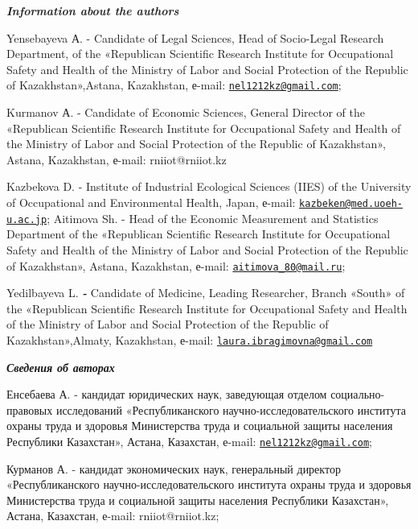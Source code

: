 \begin{authorinfo}
\emph{{\bfseries Information about the authors}}

Yensebayeva А. - Candidate of Legal Sciences, Head of Socio-Legal
Research Department, of the «Republican Scientific Research Institute
for Occupational Safety and Health of the Ministry of Labor and Social
Protection of the Republic of Kazakhstan»,Astana, Kazakhstan, е-mail:
\href{mailto:nel1212kz@gmail.com}{\nolinkurl{nel1212kz@gmail.com}};

Kurmanov А. - Candidate of Economic Sciences, General Director of the
«Republican Scientific Research Institute for Occupational Safety and
Health of the Ministry of Labor and Social Protection of the Republic of
Kazakhstan», Astana, Kazakhstan, е-mail: rniiot@rniiot.kz

Kazbekova D. - Institute of Industrial Ecological Sciences (IIES) of the
University of Occupational and Environmental Health, Japan, е-mail:
\href{mailto:kazbeken@med.uoeh-u.ac.jp}{\nolinkurl{kazbeken@med.uoeh-u.ac.jp}};
Aitimova Sh. - Head of the Economic Measurement and Statistics
Department of the «Republican Scientific Research Institute for
Occupational Safety and Health of the Ministry of Labor and Social
Protection of the Republic of Kazakhstan», Astana, Kazakhstan, е-mail:
\href{mailto:aitimova_80@mail.ru}{\nolinkurl{aitimova\_80@mail.ru}};

Yedilbayeva L. \emph{{\bfseries -}} Candidate of Medicine, Leading
Researcher, Branch «South» of the «Republican Scientific Research
Institute for Occupational Safety and Health of the Ministry of Labor
and Social Protection of the Republic of Kazakhstan»,Almaty, Kazakhstan,
е-mail:
\href{mailto:laura.ibragimovna@gmail.com}{\nolinkurl{laura.ibragimovna@gmail.com}}

\emph{{\bfseries Сведения об авторах}}

Енсебаева А. - кандидат юридических наук, заведующая отделом
социально-правовых исследований «Республиканского
научно-исследовательского института охраны труда и здоровья Министерства
труда и социальной защиты населения Республики Казахстан», Астана,
Казахстан, е-mail:
\href{mailto:nel1212kz@gmail.com}{\nolinkurl{nel1212kz@gmail.com}};

Курманов А. - кандидат экономических наук, генеральный директор
«Республиканского научно-исследовательского института охраны труда и
здоровья Министерства труда и социальной защиты населения Республики
Казахстан», Астана, Казахстан, е-mail: rniiot@rniiot.kz;


\end{authorinfo}

